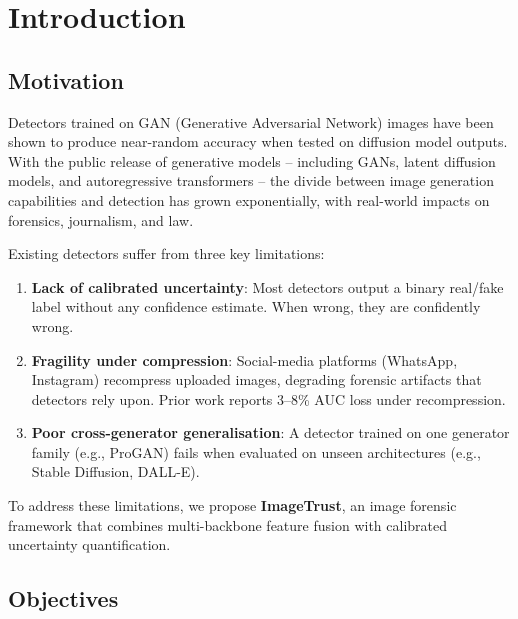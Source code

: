 
\chapter{Introduction}\label{chap:intro}


\section{Motivation}\label{sec:motivation}

Detectors trained on GAN (Generative Adversarial Network) images have been shown to produce near-random accuracy when tested on diffusion model outputs. With the public release of generative models -- including GANs, latent diffusion models, and autoregressive transformers -- the divide between image generation capabilities and detection has grown exponentially, with real-world impacts on forensics, journalism, and law.

Existing detectors suffer from three key limitations:
\begin{enumerate}
    \item \textbf{Lack of calibrated uncertainty}: Most detectors output a binary real/fake label without any confidence estimate. When wrong, they are confidently wrong.
    \item \textbf{Fragility under compression}: Social-media platforms (WhatsApp, Instagram) recompress uploaded images, degrading forensic artifacts that detectors rely upon. Prior work reports 3--8\% AUC loss under recompression.
    \item \textbf{Poor cross-generator generalisation}: A detector trained on one generator family (e.g., ProGAN) fails when evaluated on unseen architectures (e.g., Stable Diffusion, DALL-E).
\end{enumerate}

To address these limitations, we propose \textbf{ImageTrust}, an image forensic framework that combines multi-backbone feature fusion with calibrated uncertainty quantification.

\section{Objectives}\label{sec:objectives}

